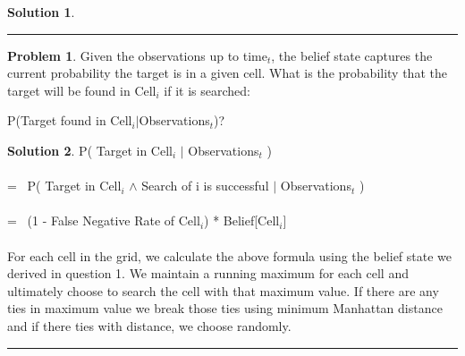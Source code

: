 \documentclass{article}
\theoremstyle{definition}
\newtheorem{problem}{Problem}
\def\fline{\rule{0.75\linewidth}{0.5pt}}
\newcommand{\finishline}{\vspace{-15pt}\begin{center}\fline\end{center}}
\newtheorem*{solution*}{Solution}
\newenvironment{solution}{\begin{solution*}}{{\finishline} \end{solution*}}
\begin{document}
\begin{solution}
\end{solution}

\smallskip

\begin{problem}
Given the observations up to time$_{t}$, the belief state captures the current probability the target is in a given cell.  What is the probability that the target will be found in Cell$_{i}$ if it is searched:
\begin{center}
P(Target found in Cell$_{i}$$|$Observations$_{t}$)?
\end{center}
\end{problem}
\smallskip
\begin{solution}
P( Target in Cell$_{i}$ $|$ Observations$_{t}$ )
\\\\
= \ P( Target in Cell$_{i}$ $\land$ Search of i is successful $|$ Observations$_{t}$ )
\\\\
= \ (1 - False Negative Rate of Cell$_{i}$) * Belief[Cell$_{i}$]
\\\\
For each cell in the grid, we calculate the above formula using the belief state we derived in question 1. We maintain a running maximum for each cell and ultimately choose to search the cell with that maximum value. If there are any ties in maximum value we break those ties using minimum Manhattan distance and if there ties with distance, we choose randomly.
\end{solution}

\smallskip
\end{document}
